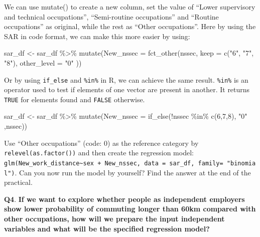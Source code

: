 \documentclass[
  letterpaper,
  DIV=11,
  numbers=noendperiod]{scrreprt}
\newenvironment{Shaded}{\begin{snugshade}}{\end{snugshade}}
\newcommand{\AttributeTok}[1]{\textcolor[rgb]{0.40,0.45,0.13}{#1}}
\newcommand{\DecValTok}[1]{\textcolor[rgb]{0.68,0.00,0.00}{#1}}
\newcommand{\FunctionTok}[1]{\textcolor[rgb]{0.28,0.35,0.67}{#1}}
\newcommand{\NormalTok}[1]{\textcolor[rgb]{0.00,0.23,0.31}{#1}}
\newcommand{\OtherTok}[1]{\textcolor[rgb]{0.00,0.23,0.31}{#1}}
\newcommand{\SpecialCharTok}[1]{\textcolor[rgb]{0.37,0.37,0.37}{#1}}
\newcommand{\StringTok}[1]{\textcolor[rgb]{0.13,0.47,0.30}{#1}}
\begin{document}
We can use mutate() to create a new column, set the value of ``Lower
supervisory and technical occupations'', ``Semi-routine occupations''
and ``Routine occupations'' as original, while the rest as ``Other
occupations''. Here by using the SAR in code format, we can make this
more easier by using:

\begin{Shaded}
\begin{Highlighting}[]
\NormalTok{sar\_df }\OtherTok{\textless{}{-}}\NormalTok{ sar\_df }\SpecialCharTok{\%\textgreater{}\%} \FunctionTok{mutate}\NormalTok{(}\AttributeTok{New\_nssec =} \FunctionTok{fct\_other}\NormalTok{(nssec,   }\AttributeTok{keep =} \FunctionTok{c}\NormalTok{(}\StringTok{"6"}\NormalTok{, }\StringTok{"7"}\NormalTok{, }\StringTok{"8"}\NormalTok{),   }\AttributeTok{other\_level =} \StringTok{"0"}\NormalTok{ ))}
\end{Highlighting}
\end{Shaded}

Or by using \texttt{if\_else} and \texttt{\%in\%} in R, we can achieve
the same result. \texttt{\%in\%} is an operator used to test if elements
of one vector are present in another. It returns \texttt{TRUE} for
elements found and \texttt{FALSE} otherwise.

\begin{Shaded}
\begin{Highlighting}[]
\NormalTok{sar\_df }\OtherTok{\textless{}{-}}\NormalTok{ sar\_df }\SpecialCharTok{\%\textgreater{}\%} \FunctionTok{mutate}\NormalTok{(}\AttributeTok{New\_nssec =} \FunctionTok{if\_else}\NormalTok{(}\SpecialCharTok{!}\NormalTok{nssec }\SpecialCharTok{\%in\%} \FunctionTok{c}\NormalTok{(}\DecValTok{6}\NormalTok{,}\DecValTok{7}\NormalTok{,}\DecValTok{8}\NormalTok{), }\StringTok{"0"}\NormalTok{ ,nssec))}
\end{Highlighting}
\end{Shaded}

Use ``Other occupations'' (code: 0) as the reference category by
\texttt{relevel(as.factor())} and then create the regression model:
\texttt{glm(New\_work\_distance\textasciitilde{}sex\ +\ New\_nssec,\ data\ =\ sar\_df,\ family=\ "binomial")}.
Can you now run the model by yourself? Find the answer at the end of the
practical.

\textbf{Q4}. \textbf{If we want to explore whether people as independent
employers show lower probability of commuting longer than 60km compared
with other occupations, how will we prepare the input independent
variables and what will be the specified regression model?}
\end{document}
